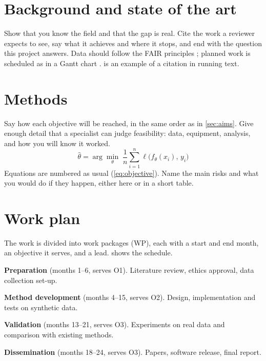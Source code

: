 \documentclass[11pt,a4paper,parskip=half-]{scrartcl}
\begin{document}
\section{Background and state of the art}
Show that you know the field and that the gap is real. Cite the work a reviewer expects to
see, say what it achieves and where it stops, and end with the question this project answers.
Data should follow the FAIR principles \citep{wilkinson2016}; planned work is scheduled
as in a Gantt chart \citep{gantt1919}. \citet{kingma2015} is an example of a citation in running text.

\section{Methods}
Say how each objective will be reached, in the same order as in \cref{sec:aims}. Give
enough detail that a specialist can judge feasibility: data, equipment, analysis, and how
you will know it worked.
\begin{equation}
  \hat{\theta} = \arg\min_{\theta}\; \frac{1}{n}\sum_{i=1}^{n} \ell\bigl(f_{\theta}(x_i),\, y_i\bigr)
  \label{eq:objective}
\end{equation}
Equations are numbered as usual (\cref{eq:objective}). Name the main risks and what you
would do if they happen, either here or in a short table.

\section{Work plan}\label{sec:plan}
The work is divided into work packages (WP), each with a start and end month, an
objective it serves, and a lead.  shows the schedule.

\begin{description}[leftmargin=2.8em,labelwidth=2.6em,labelsep=0.2em,font=\bfseries]
  \item[WP1] \textbf{Preparation} (months 1--6, serves O1). Literature review, ethics approval, data collection set-up.
  \item[WP2] \textbf{Method development} (months 4--15, serves O2). Design, implementation and tests on synthetic data.
  \item[WP3] \textbf{Validation} (months 13--21, serves O3). Experiments on real data and comparison with existing methods.
  \item[WP4] \textbf{Dissemination} (months 18--24, serves O3). Papers, software release, final report.
\end{description}
\end{document}
